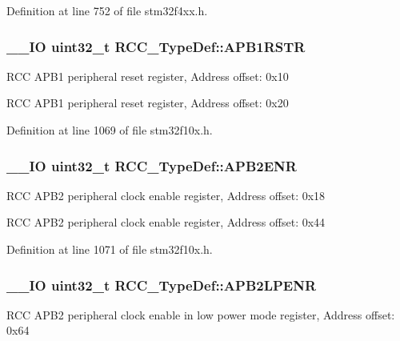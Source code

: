 Definition at line 752 of file stm32f4xx.\-h.

\hypertarget{struct_r_c_c___type_def_a600f4d6d592f43edb2fc653c5cba023a}{
\subsubsection[{A\-P\-B1\-R\-S\-T\-R}]{\setlength{\rightskip}{0pt plus 5cm}\-\_\-\-\_\-\-I\-O {\bf uint32\-\_\-t} R\-C\-C\-\_\-\-Type\-Def\-::\-A\-P\-B1\-R\-S\-T\-R}}\label{struct_r_c_c___type_def_a600f4d6d592f43edb2fc653c5cba023a}
R\-C\-C A\-P\-B1 peripheral reset register, Address offset\-: 0x10

R\-C\-C A\-P\-B1 peripheral reset register, Address offset\-: 0x20 

Definition at line 1069 of file stm32f10x.\-h.

\hypertarget{struct_r_c_c___type_def_a619b4c22f630a269dfd0c331f90f6868}{
\subsubsection[{A\-P\-B2\-E\-N\-R}]{\setlength{\rightskip}{0pt plus 5cm}\-\_\-\-\_\-\-I\-O {\bf uint32\-\_\-t} R\-C\-C\-\_\-\-Type\-Def\-::\-A\-P\-B2\-E\-N\-R}}\label{struct_r_c_c___type_def_a619b4c22f630a269dfd0c331f90f6868}
R\-C\-C A\-P\-B2 peripheral clock enable register, Address offset\-: 0x18

R\-C\-C A\-P\-B2 peripheral clock enable register, Address offset\-: 0x44 

Definition at line 1071 of file stm32f10x.\-h.

\hypertarget{struct_r_c_c___type_def_a7e46c65220f00a6858a5b35b74a37b51}{
\subsubsection[{A\-P\-B2\-L\-P\-E\-N\-R}]{\setlength{\rightskip}{0pt plus 5cm}\-\_\-\-\_\-\-I\-O {\bf uint32\-\_\-t} R\-C\-C\-\_\-\-Type\-Def\-::\-A\-P\-B2\-L\-P\-E\-N\-R}}\label{struct_r_c_c___type_def_a7e46c65220f00a6858a5b35b74a37b51}
R\-C\-C A\-P\-B2 peripheral clock enable in low power mode register, Address offset\-: 0x64 

